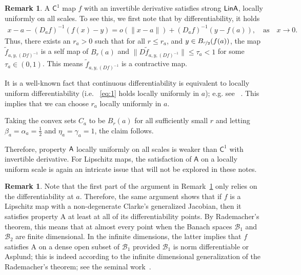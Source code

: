 \documentclass[a4, 12pt,leqno]{amsart}
\theoremstyle{plain}
\theoremstyle{definition}
\newtheorem{remark}[lemma]{Remark}
\theoremstyle{remark}
\numberwithin{equation}{section}
\newcommand{\B}{\mathcal{B}}
\begin{document}
\begin{remark}\label{rem:C1}
	A $\mathsf{C}^1$ map $f$ with an invertible derivative satisfies strong ${\sf LinA}$, locally uniformly on all scales. To see this, we first note that by differentiability, it holds
	\begin{align}\label{eq:1}
	x-a - (D_af)^{-1}(f(x)-y) = o(\|x-a\|) + (D_af)^{-1}(y - f(a)), \quad \text{as} \quad x \to 0.
	\end{align}
Thus, there exists an $r_a>0$ such that for all $r\le r_a$, and $y \in B_{\nicefrac{r}{2}}(f(a))$, the map
	$
	\tilde{f}_{a,y,(Df)^{-1}} 
	$
	is a self map of $B_r(a)$ and $\|D\tilde{f}_{a,y,(Df)^{-1}}\|\le \tau_a 
	<1$ for some $\tau_a \in (0,1)$. This means $\tilde{f}_{a,y,(Df)^{-1}}$ is a contractive map. 
\par It is a well-known fact that continuous differentiability is equivalent to locally uniform differentiability (i.e. ~\eqref{eq:1} holds locally uniformly in $a$); e.g. see ~\cite[Page 35]{yamamuro}. This implies that we can choose $r_a$ locally uniformly in $a$. 
\par Taking the convex sets $C_a$ to be $B_r(a)$ for all sufficiently small $r$ and letting $\beta_a = \alpha_a = \frac{1}{2}$ and $\eta_a = \gamma_a = 1$, the claim follows. 
\par Therefore, property ${\sf A}$ locally uniformly on all scales is weaker than $\mathsf{C}^1$ with invertible derivative. For Lipschitz maps, the satisfaction of $\textsf{A}$ on a locally uniform scale is again an intricate issue that will not be explored in these notes. 
\end{remark}

\begin{remark}
\par Note that the first part of the argument in Remark~\ref{rem:C1} only relies on the differentiability at $a$. Therefore, the same argument shows that if $f$ is a Lipschitz map with a	 non-degenerate Clarke's generalized Jacobian, then it satisfies property $\text{A}$ at least at all of its differentiability points. By Rademacher's theorem, this means that 	at almost every point when the Banach spaces $\B_1$ and $\B_2$ are finite dimensional. In the infinite dimensions, the latter implies that $f$ satisfies $\text{A}$ on a dense open subset of $\B_1$ provided $\B_1$ is norm differentiable or Asplund; this is indeed according to the infinite dimensional generalization of the Rademacher's theorem; see the seminal work~\cite{Preiss}.
\end{remark}
\end{document}

